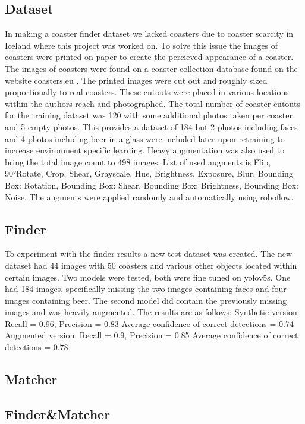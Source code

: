 \documentclass{article}
\begin{document}
\subsection{Dataset}
In making a coaster finder dataset we lacked coasters due to coaster scarcity in Iceland where this project was worked on.
To solve this issue the images of coasters were printed on paper to create the percieved appearance of a coaster. The images of coasters
were found on a coaster collection database found on the website coasters.eu \cite{}. The printed images were cut out and roughly sized proportionally to real coasters. 
These cutouts were placed in various locations within the authors reach and photographed. The total number of coaster cutouts for the 
training dataset was 120 with some additional photos taken per coaster and 5 empty photos. This provides a dataset of 184 but 2 photos
including faces and 4 photos including beer in a glass were included later upon retraining to increase environment specific learning.
Heavy augmentation was also used to bring the total image count to 498 images. List of used augments is Flip, 90°Rotate, Crop, Shear, Grayscale, Hue, Brightness, Exposure, Blur,
Bounding Box: Rotation, Bounding Box: Shear, Bounding Box: Brightness, Bounding Box: Noise. The augments were applied randomly and automatically using roboflow.

\subsection{Finder}

To experiment with the finder results a new test dataset was created. The new dataset had 44 images with 50 coasters and various other objects located
within certain images. Two models were tested, both were fine tuned on yolov5s. One had 184 images, specifically missing the two images containing faces and four images containing beer.
The second model did contain the previously missing images and was heavily augmented. The results are as follows: 
Synthetic version:
    Recall = 0.96, Precision = 0.83
    Average confidence of correct detections = 0.74
Augmented version:
    Recall = 0.9, Precision = 0.85
    Average confidence of correct detections = 0.78

\subsection{Matcher}

\subsection{Finder\&Matcher}
\end{document}
